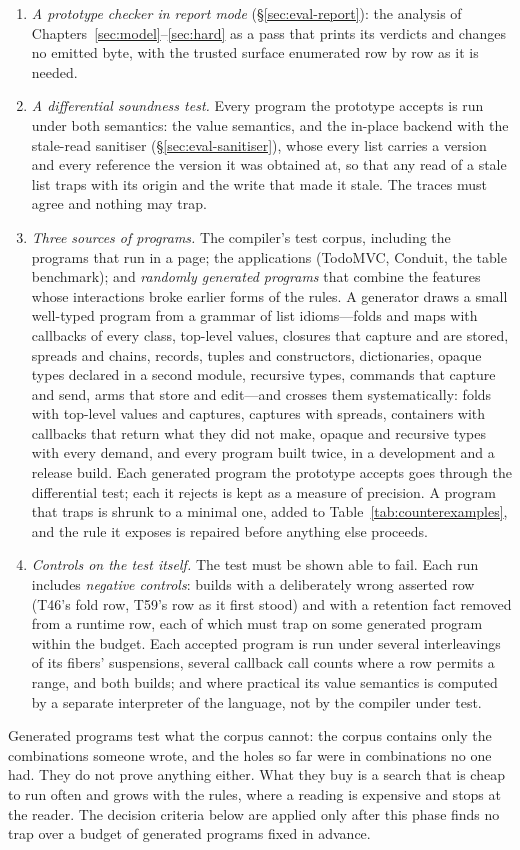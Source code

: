 \begin{enumerate}
\item \emph{A prototype checker in report mode} (\S\ref{sec:eval-report}): the analysis of
Chapters~\ref{sec:model}--\ref{sec:hard} as a pass that prints its verdicts and changes no emitted byte,
with the trusted surface enumerated row by row as it is needed.
\item \emph{A differential soundness test.} Every program the prototype accepts is run under both
semantics: the value semantics, and the in-place backend with the stale-read sanitiser
(\S\ref{sec:eval-sanitiser}), whose every list carries a version and every reference the version it was
obtained at, so that any read of a stale list traps with its origin and the write that made it stale. The
traces must agree and nothing may trap.
\item \emph{Three sources of programs.} The compiler's test corpus, including the programs that run in a
page; the applications (TodoMVC, Conduit, the table benchmark); and \emph{randomly generated programs}
that combine the features whose interactions broke earlier forms of the rules. A generator draws a small
well-typed program from a grammar of list idioms---folds and maps with callbacks of every class,
top-level values, closures that capture and are stored, spreads and \code{++} chains, records, tuples and
constructors, dictionaries, opaque types declared in a second module, recursive types, commands that
capture and send,  arms that store and edit---and crosses them systematically: folds with
top-level values and captures, captures with spreads, containers with callbacks that return what they did
not make, opaque and recursive types with every demand, and every program built twice, in a development
and a release build. Each generated program the prototype accepts goes through the differential test; each
it rejects is kept as a measure of precision. A program that traps is shrunk to a minimal one, added to
Table~\ref{tab:counterexamples}, and the rule it exposes is repaired before anything else proceeds.
\item \emph{Controls on the test itself.} The test must be shown able to fail. Each run includes
\emph{negative controls}: builds with a deliberately wrong asserted row (T46's fold row, T59's
 row as it first stood) and with a retention fact removed from a runtime row, each of which
must trap on some generated program within the budget. Each accepted program is run under several
interleavings of its fibers' suspensions, several callback call counts where a row permits a range, and
both builds; and where practical its value semantics is computed by a separate interpreter of the
language, not by the compiler under test.
\end{enumerate}
Generated programs test what the corpus cannot: the corpus contains only the combinations someone wrote,
and the holes so far were in combinations no one had. They do not prove anything either. What they buy is
a search that is cheap to run often and grows with the rules, where a reading is expensive and stops at
the reader. The decision criteria below are applied only after this phase finds no trap over a budget of
generated programs fixed in advance.

